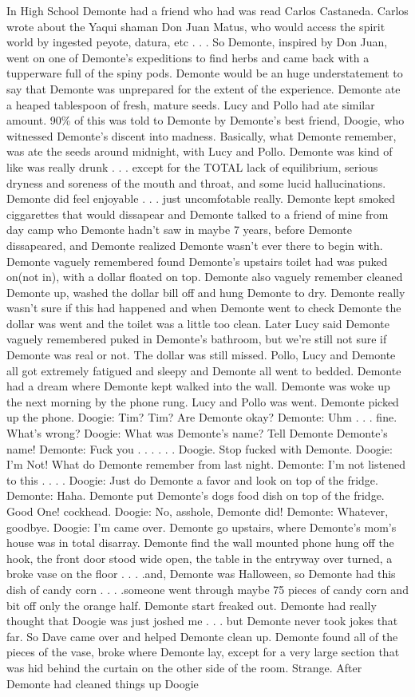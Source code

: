 \documentclass[12pt]{book}
\begin{document}
In High School Demonte had a friend who had was read Carlos Castaneda. Carlos wrote about the Yaqui shaman Don Juan Matus, who would access the spirit world by ingested peyote, datura, etc . . .  So Demonte, inspired by Don Juan, went on one of Demonte's expeditions to find herbs and came back with a tupperware full of the spiny pods. Demonte would be an huge understatement to say that Demonte was unprepared for the extent of the experience. Demonte ate a heaped tablespoon of fresh, mature seeds. Lucy and Pollo had ate similar amount. 90\% of this was told to Demonte by Demonte's best friend, Doogie, who witnessed Demonte's discent into madness. Basically, what Demonte remember, was ate the seeds around midnight, with Lucy and Pollo. Demonte was kind of like was really drunk . . .  except for the TOTAL lack of equilibrium, serious dryness and soreness of the mouth and throat, and some lucid hallucinations. Demonte did feel enjoyable . . .  just uncomfotable really. Demonte kept smoked ciggarettes that would dissapear and Demonte talked to a friend of mine from day camp who Demonte hadn't saw in maybe 7 years, before Demonte dissapeared, and Demonte realized Demonte wasn't ever there to begin with. Demonte vaguely remembered found Demonte's upstairs toilet had was puked on(not in), with a dollar floated on top. Demonte also vaguely remember cleaned Demonte up, washed the dollar bill off and hung Demonte to dry. Demonte really wasn't sure if this had happened and when Demonte went to check Demonte the dollar was went and the toilet was a little too clean. Later Lucy said Demonte vaguely remembered puked in Demonte's bathroom, but we're still not sure if Demonte was real or not. The dollar was still missed. Pollo, Lucy and Demonte all got extremely fatigued and sleepy and Demonte all went to bedded. Demonte had a dream where Demonte kept walked into the wall. Demonte was woke up the next morning by the phone rung. Lucy and Pollo was went. Demonte picked up the phone. Doogie: Tim? Tim? Are Demonte okay? Demonte: Uhm . . .  fine. What's wrong? Doogie: What was Demonte's name? Tell Demonte Demonte's name! Demonte: Fuck you . . .   . . .  Doogie. Stop fucked with Demonte. Doogie: I'm Not! What do Demonte remember from last night. Demonte: I'm not listened to this . . .  . Doogie: Just do Demonte a favor and look on top of the fridge. Demonte: Haha. Demonte put Demonte's dogs food dish on top of the fridge. Good One! cockhead. Doogie: No, asshole, Demonte did! Demonte: Whatever, goodbye. Doogie: I'm came over. Demonte go upstairs, where Demonte's mom's house was in total disarray. Demonte find the wall mounted phone hung off the hook, the front door stood wide open, the table in the entryway over turned, a broke vase on the floor . . .  .and, Demonte was Halloween, so Demonte had this dish of candy corn . . .  .someone went through maybe 75 pieces of candy corn and bit off only the orange half. Demonte start freaked out. Demonte had really thought that Doogie was just joshed me . . .  but Demonte never took jokes that far. So Dave came over and helped Demonte clean up. Demonte found all of the pieces of the vase, broke where Demonte lay, except for a very large section that was hid behind the curtain on the other side of the room. Strange. After Demonte had cleaned things up Doogie 
\end{document}
